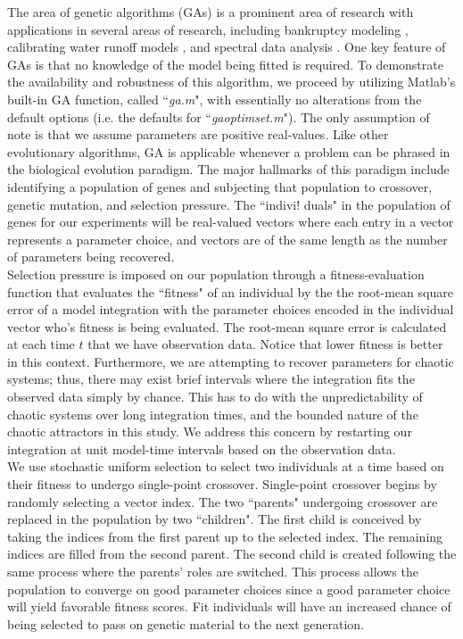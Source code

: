 \documentclass[onecolumn]{article}
\begin{document}
\begin{multicols}{2}
\indent The area of genetic algorithms (GAs) is a prominent area of research \cite{GA1,GA2} with applications in several areas of research, including bankruptcy modeling \cite{Shin2002321}, calibrating water runoff models \cite{WRR}, and spectral data analysis \cite{CEM}. One key feature of GAs is that no knowledge of the model being fitted is required. To demonstrate the availability and robustness of this algorithm, we proceed by utilizing Matlab's built-in GA function, called ``{\it ga.m}", with essentially no alterations from the default options (i.e. the defaults for ``{\it gaoptimset.m}"). The only assumption of note is that we assume parameters are positive real-values. Like other evolutionary algorithms, GA is applicable whenever a problem can be phrased in the biological evolution paradigm. The major hallmarks of this paradigm include identifying a population of genes and subjecting that population to crossover, genetic mutation, and selection pressure. The ``indivi!
 duals" in the population of genes for our experiments will be real-valued vectors where each entry in a vector represents a parameter choice, and vectors are of the same length as the number of parameters being recovered. \\
\indent Selection pressure is imposed on our population through a fitness-evaluation function that evaluates the ``fitness" of an individual by the the root-mean square error of a model integration with the parameter choices encoded in the individual vector who's fitness is being evaluated. The root-mean square error is calculated at each time $t$ that we have observation data. Notice that lower fitness is better in this context. Furthermore, we are attempting to recover parameters for chaotic systems; thus, there may exist brief intervals where the integration fits the observed data simply by chance. This has to do with the unpredictability of chaotic systems  over long integration times, and the bounded nature of the chaotic attractors in this study. We address this concern by restarting our integration at unit model-time intervals based on the observation data.\\
\indent We use stochastic uniform selection to select two individuals at a time based on their fitness to undergo single-point crossover. Single-point crossover begins by randomly selecting a  vector index. The two ``parents" undergoing crossover are replaced in the population by two ``children". The first child is conceived by taking the indices from the first parent up to the selected index. The remaining indices are filled from the second parent. The second child is created following the same process where the parents' roles are switched. This process allows the population to converge on good parameter choices since a good parameter choice will yield favorable fitness scores. Fit individuals will have an increased chance of being selected to pass on genetic material to the next generation.\\

\end{multicols}
\end{document}
